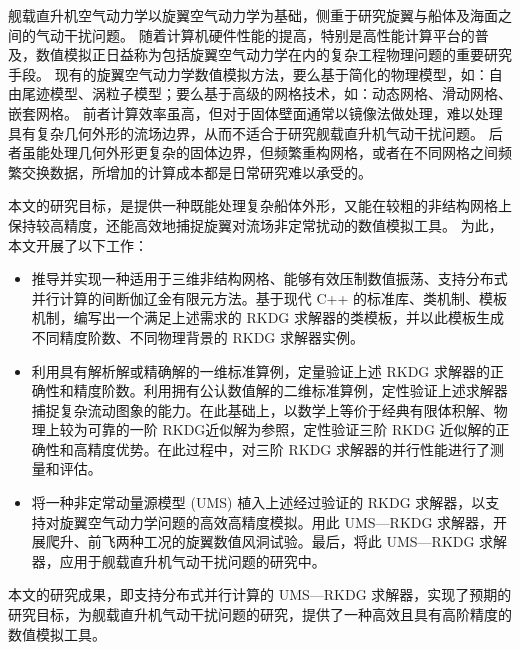 
\begin{cabstract}
舰载直升机空气动力学以旋翼空气动力学为基础，侧重于研究旋翼与船体及海面之间的气动干扰问题。
随着计算机硬件性能的提高，特别是高性能计算平台的普及，数值模拟正日益称为包括旋翼空气动力学在内的复杂工程物理问题的重要研究手段。
现有的旋翼空气动力学数值模拟方法，要么基于简化的物理模型，如：自由尾迹模型、涡粒子模型；要么基于高级的网格技术，如：动态网格、滑动网格、嵌套网格。
前者计算效率虽高，但对于固体壁面通常以镜像法做处理，难以处理具有复杂几何外形的流场边界，从而不适合于研究舰载直升机气动干扰问题。
后者虽能处理几何外形更复杂的固体边界，但频繁重构网格，或者在不同网格之间频繁交换数据，所增加的计算成本都是日常研究难以承受的。

本文的研究目标，是提供一种既能处理复杂船体外形，又能在较粗的非结构网格上保持较高精度，还能高效地捕捉旋翼对流场非定常扰动的数值模拟工具。
为此，本文开展了以下工作：
\begin{itemize}
\item 推导并实现一种适用于三维非结构网格、能够有效压制数值振荡、支持分布式并行计算的间断伽辽金有限元方法。基于现代 C++ 的标准库、类机制、模板机制，编写出一个满足上述需求的 RKDG 求解器的类模板，并以此模板生成不同精度阶数、不同物理背景的 RKDG 求解器实例。
\item 利用具有解析解或精确解的一维标准算例，定量验证上述 RKDG 求解器的正确性和精度阶数。利用拥有公认数值解的二维标准算例，定性验证上述求解器捕捉复杂流动图象的能力。在此基础上，以数学上等价于经典有限体积解、物理上较为可靠的一阶 RKDG近似解为参照，定性验证三阶 RKDG 近似解的正确性和高精度优势。在此过程中，对三阶 RKDG 求解器的并行性能进行了测量和评估。
\item 将一种非定常动量源模型 (UMS) 植入上述经过验证的 RKDG 求解器，以支持对旋翼空气动力学问题的高效高精度模拟。用此 UMS—RKDG 求解器，开展爬升、前飞两种工况的旋翼数值风洞试验。最后，将此 UMS—RKDG 求解器，应用于舰载直升机气动干扰问题的研究中。
\end{itemize}

本文的研究成果，即支持分布式并行计算的 UMS—RKDG 求解器，实现了预期的研究目标，为舰载直升机气动干扰问题的研究，提供了一种高效且具有高阶精度的数值模拟工具。
\end{cabstract}


